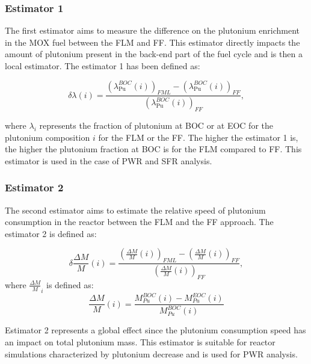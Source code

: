 \subsubsection{Estimator 1}

The first estimator aims to measure the difference on the plutonium enrichment
in the \gls{MOX} fuel between the \gls{FLM} and \gls{FF}. This estimator directly
impacts the amount of plutonium present in the back-end part of the fuel cycle
and is then a local estimator. The estimator 1 has been defined as:

\begin{equation}
    \delta{\lambda}(i) =
        \frac{\left(\lambda_{\mathrm{Pu}}^{BOC}(i)\right)_{FML}
              - \left(\lambda_{\mathrm{Pu}}^{BOC}(i)\right)_{FF}}
              {\left(\lambda_{\mathrm{Pu}}^{BOC}(i)\right)_{FF}},
\end{equation}

where $\lambda_i$ represents the fraction of plutonium at \gls{BOC} or at
\gls{EOC} for the plutonium composition $i$ for the \gls{FLM} or the \gls{FF}.
The higher the estimator 1 is, the higher the plutonium fraction at \gls{BOC} is
for the \gls{FLM} compared to \gls{FF}. This estimator is used in the case of
\gls{PWR} and \gls{SFR} analysis.

\subsubsection{Estimator 2}

The second estimator aims to estimate the relative speed of plutonium
consumption in the reactor between the \gls{FLM} and the \gls{FF} approach. The
estimator 2 is defined as:

\begin{equation}
    \delta{\frac{\Delta M}{M}}(i) =
        \frac{\left(\frac{\Delta M}{M}(i)\right)_{FML}
              - \left(\frac{\Delta M}{M}(i)\right)_{FF}}
             {\left(\frac{\Delta M}{M}(i)\right)_{FF}},
\end{equation}
where $\frac{\Delta M}{M}_{i}$ is defined as:
\begin{equation}
    \frac{\Delta M}{M}(i) = \frac{M_{Pu}^{BOC}(i) -
    M_{Pu}^{EOC}(i)}{M_{Pu}^{BOC}(i)}
\end{equation}

Estimator 2 represents a global effect since the plutonium consumption speed has
an impact on total plutonium mass. This estimator is suitable for reactor
simulations characterized by plutonium decrease and is used for \gls{PWR} analysis.

